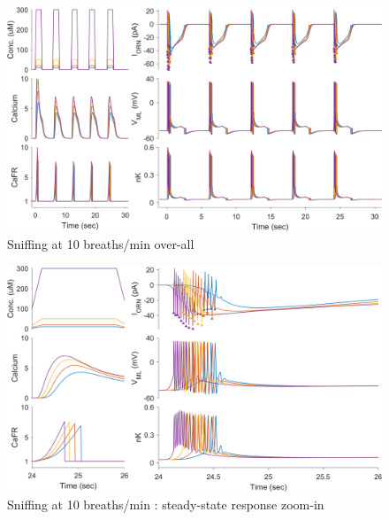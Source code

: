 \documentclass[
]{article}
\begin{document}
\begin{figure}

{\centering \includegraphics[width=0.95\linewidth]{figs/sniff/fig_spk_sniffing_10bpm} 

}

\caption{Sniffing at 10 breaths/min over-all}\label{fig:f10bpm}
\end{figure}

\begin{figure}

{\centering \includegraphics[width=0.95\linewidth]{figs/sniff/fig_spk_sniffing_10bpm_last} 

}

\caption{Sniffing at 10 breaths/min : steady-state response zoom-in}\label{fig:f10bpmSS}
\end{figure}
\end{document}
